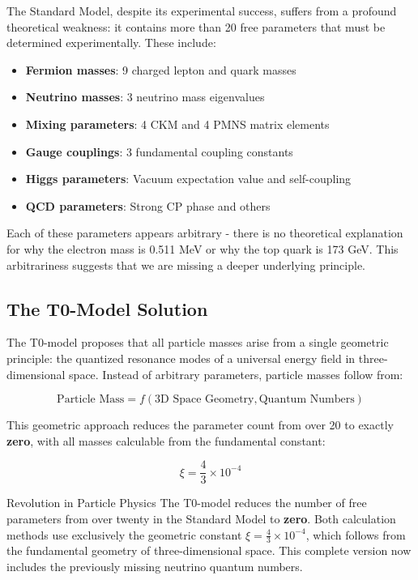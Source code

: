 \documentclass[12pt,a4paper]{article}
\newcommand{\xipar}{\xi}
\begin{document}
	The Standard Model, despite its experimental success, suffers from a profound theoretical weakness: it contains more than 20 free parameters that must be determined experimentally. These include:
	
	\begin{itemize}
		\item \textbf{Fermion masses}: 9 charged lepton and quark masses
		\item \textbf{Neutrino masses}: 3 neutrino mass eigenvalues
		\item \textbf{Mixing parameters}: 4 CKM and 4 PMNS matrix elements
		\item \textbf{Gauge couplings}: 3 fundamental coupling constants
		\item \textbf{Higgs parameters}: Vacuum expectation value and self-coupling
		\item \textbf{QCD parameters}: Strong CP phase and others
	\end{itemize}
	
	Each of these parameters appears arbitrary - there is no theoretical explanation for why the electron mass is 0.511 MeV or why the top quark is 173 GeV. This arbitrariness suggests that we are missing a deeper underlying principle.
	
	\subsection{The T0-Model Solution}
	\label{subsec:t0_solution}
	
	The T0-model proposes that all particle masses arise from a single geometric principle: the quantized resonance modes of a universal energy field in three-dimensional space. Instead of arbitrary parameters, particle masses follow from:
	
	\begin{equation}
		\text{Particle Mass} = f(\text{3D Space Geometry}, \text{Quantum Numbers})
		\label{eq:t0_principle}
	\end{equation}
	
	This geometric approach reduces the parameter count from over 20 to exactly \textbf{zero}, with all masses calculable from the fundamental constant:
	
	\begin{equation}
		\xi = \frac{4}{3} \times 10^{-4}
		\label{eq:fundamental_constant}
	\end{equation}
	
	\begin{important}{Revolution in Particle Physics}{}
		The T0-model reduces the number of free parameters from over twenty in the Standard Model to \textbf{zero}. Both calculation methods use exclusively the geometric constant $\xipar = \frac{4}{3} \times 10^{-4}$, which follows from the fundamental geometry of three-dimensional space. This complete version now includes the previously missing neutrino quantum numbers.
	\end{important}
	
\end{document}
